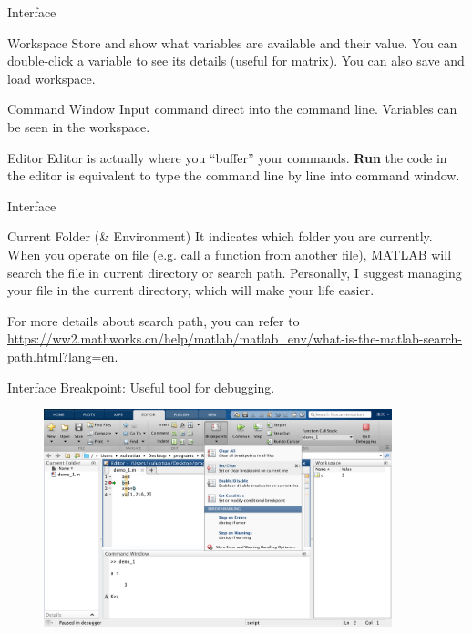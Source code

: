 \begin{frame}{Interface}
\begin{block}{Workspace}
Store and show what variables are available and their value. You can double-click a variable to see its details (useful for matrix). You can also save and load workspace.
\end{block}
\begin{block}{Command Window}
Input command direct into the command line. Variables can be seen in the workspace.
\end{block}
\begin{block}{Editor}
Editor is actually where you ``buffer'' your commands. \textbf{Run} the code in the editor is equivalent to type the command line by line into command window.
\end{block}
\end{frame}


\begin{frame}{Interface}
\begin{block}{Current Folder (\& Environment)}
It indicates which folder you are currently. When you operate on file (e.g. call a function from another file), MATLAB will search the file in current directory or search path. Personally, I suggest managing your file in the current directory, which will make your life easier.

For more details about search path, you can refer to \url{https://ww2.mathworks.cn/help/matlab/matlab_env/what-is-the-matlab-search-path.html?lang=en}.
\end{block}
\end{frame}

\begin{frame}{Interface}
Breakpoint: Useful tool for debugging.
\begin{figure}[htbp]
\centering
\includegraphics[width=0.9\textwidth]{pic/breakpoint.png}
\end{figure}
\end{frame}

